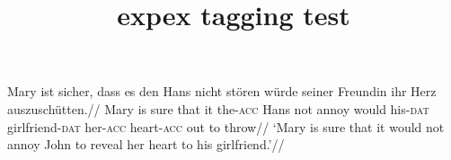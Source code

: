 \documentclass{report}
\title{expex tagging test}
\begin{document}
\ex
\begingl
\gla Mary ist sicher, dass es den Hans nicht st\"oren
w\"urde seiner Freundin ihr Herz auszusch\"utten.//
\glb Mary is sure that it the-{\scshape acc} Hans not annoy would
his-{\scshape dat} girlfriend-{\scshape dat} her-{\scshape acc} heart-{\scshape acc} {out to
throw}//
\glft ‘Mary is sure that it would not annoy John to reveal her
heart to his girlfriend.’//
\endgl
\xe
\end{document}
